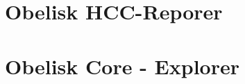 \begin{appendices}
\section{Obelisk HCC-Reporer}
\label{appendix:obelisk_hcc_reporter}

\begin{figure}[htp]
\end{figure}
\newpage

\section{Obelisk Core - Explorer}
\label{appendix:obelisk_explorer}


\end{appendices}
